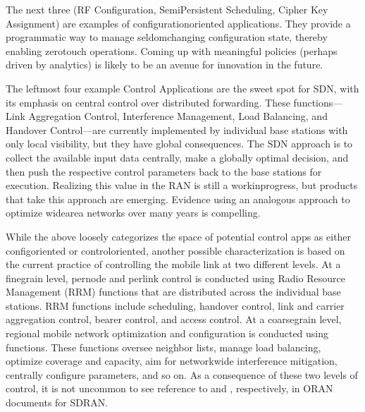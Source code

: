 \documentclass[a4paper,11pt,english]{sphinxmanual}
\begin{document}
\sphinxAtStartPar
The next three (RF Configuration, Semi\sphinxhyphen{}Persistent Scheduling, Cipher Key
Assignment) are examples of configuration\sphinxhyphen{}oriented applications. They
provide a programmatic way to manage seldom\sphinxhyphen{}changing configuration
state, thereby enabling zero\sphinxhyphen{}touch operations. Coming up with meaningful
policies (perhaps driven by analytics) is likely to be an avenue for
innovation in the future.

\sphinxAtStartPar
The left\sphinxhyphen{}most four example Control Applications are the sweet spot for
SDN, with its emphasis on central control over distributed
forwarding. These functions—Link Aggregation Control, Interference
Management, Load Balancing, and Handover Control—are currently
implemented by individual base stations with only local visibility,
but they have global consequences. The SDN approach is to collect the
available input data centrally, make a globally optimal decision, and
then push the respective control parameters back to the base stations
for execution. Realizing this value in the RAN is still a
work\sphinxhyphen{}in\sphinxhyphen{}progress, but products that take this approach are
emerging. Evidence using an analogous approach to optimize
wide\sphinxhyphen{}area networks over many years is compelling.

\sphinxAtStartPar
While the above loosely categorizes the space of potential control
apps as either config\sphinxhyphen{}oriented or control\sphinxhyphen{}oriented, another possible
characterization is based on the current practice of controlling the
mobile link at two different levels. At a fine\sphinxhyphen{}grain level, per\sphinxhyphen{}node
and per\sphinxhyphen{}link control is conducted using Radio Resource Management
(RRM) functions that are distributed across the individual base
stations.  RRM functions include scheduling, handover control, link
and carrier aggregation control, bearer control, and access control.
At a coarse\sphinxhyphen{}grain level, regional mobile network optimization and
configuration is conducted using 
functions. These functions oversee neighbor lists, manage load
balancing, optimize coverage and capacity, aim for network\sphinxhyphen{}wide
interference mitigation, centrally configure parameters, and so on. As
a consequence of these two levels of control, it is not uncommon to
see reference to  and ,
respectively, in O\sphinxhyphen{}RAN documents for SD\sphinxhyphen{}RAN.
\end{document}
